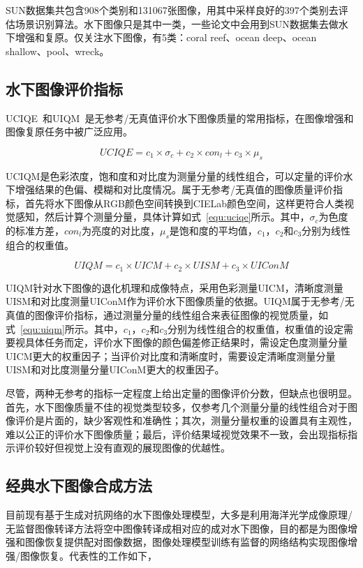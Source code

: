 SUN数据集共包含908个类别和131067张图像，用其中采样良好的397个类别去评估场景识别算法。水下图像只是其中一类，一些论文中会用到SUN数据集去做水下增强和复原。仅关注水下图像，有5类：coral reef、ocean deep、ocean shallow、pool、wreck。

\subsection{水下图像评价指标}
UCIQE~\cite{yang2015underwater}和UIQM~\cite{panetta2015human}是无参考/无真值评价水下图像质量的常用指标，在图像增强和图像复原任务中被广泛应用。

\begin{equation}
\label{equ:uciqe}
UCIQE = c_1 \times \sigma_c + c_2 \times con_l + c_3 \times \mu_s
\end{equation}

UCIQM是色彩浓度，饱和度和对比度为测量分量的线性组合，可以定量的评价水下增强结果的色偏、模糊和对比度情况。属于无参考/无真值的图像质量评价指标，首先将水下图像从RGB颜色空间转换到CIELab颜色空间，这样更符合人类视觉感知，然后计算个测量分量，具体计算如式~\ref{equ:uciqe}所示。其中，$ \sigma_c$为色度的标准方差，$con_l$为亮度的对比度，$\mu_s$是饱和度的平均值，$c_1$，$c_2$和$c_3$分别为线性组合的权重值。

\begin{equation}
\label{equ:uiqm}
UIQM = c_1 \times UICM + c_2 \times UISM + c_3 \times UIConM
\end{equation}

UIQM针对水下图像的退化机理和成像特点，采用色彩测量UICM，清晰度测量UISM和对比度测量UIConM作为评价水下图像质量的依据。UIQM属于无参考/无真值的图像评价指标，通过测量分量的线性组合来表征图像的视觉质量，如式~\ref{equ:uiqm}所示。其中，$c_1$，$c_2$和$c_3$分别为线性组合的权重值，权重值的设定需要视具体任务而定，评价水下图像的颜色偏差修正结果时，需设定色度测量分量UICM更大的权重因子；当评价对比度和清晰度时，需要设定清晰度测量分量UISM和对比度测量分量UIConM更大的权重因子。

尽管，两种无参考的指标一定程度上给出定量的图像评价分数，但缺点也很明显。首先，水下图像质量不佳的视觉类型较多，仅参考几个测量分量的线性组合对于图像评价是片面的，缺少客观性和准确性；其次，测量分量权重的设置具有主观性，难以公正的评价水下图像质量；最后，评价结果域视觉效果不一致，会出现指标指示评价较好但视觉上没有直观的展现图像的优越性。


\subsection{经典水下图像合成方法}
目前现有基于生成对抗网络的水下图像处理模型，大多是利用海洋光学成像原理/无监督图像转译方法将空中图像转译成相对应的成对水下图像，目的都是为图像增强和图像恢复提供配对图像数据，图像处理模型训练有监督的网络结构实现图像增强/图像恢复。代表性的工作如下，

